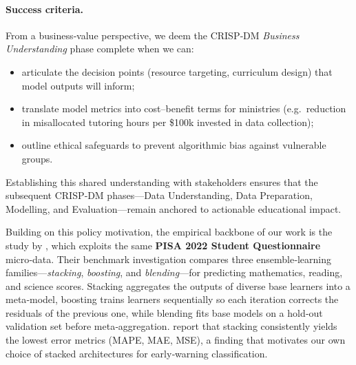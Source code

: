 \paragraph{Success criteria.}
From a business‑value perspective, we deem the CRISP‑DM \emph{Business Understanding} phase complete when we can:

\begin{itemize}
    \item articulate the decision points (resource targeting, curriculum design) that model outputs will inform;
    \item translate model metrics into cost–benefit terms for ministries (e.g.\ reduction in misallocated tutoring hours per \$100k invested in data collection);
    \item outline ethical safeguards to prevent algorithmic bias against vulnerable groups.
\end{itemize}

Establishing this shared understanding with stakeholders ensures that the subsequent CRISP‑DM phases—Data Understanding, Data Preparation, Modelling, and Evaluation—remain anchored to actionable educational impact.


Building on this policy motivation, the empirical backbone of our work is the study by \cite{Stacking}, which exploits the same \textbf{PISA 2022 Student Questionnaire} micro‑data.  Their benchmark investigation compares three ensemble‑learning families—\emph{stacking}, \emph{boosting}, and \emph{blending}—for predicting mathematics, reading, and science scores.  Stacking aggregates the outputs of diverse base learners into a meta‑model, boosting trains learners sequentially so each iteration corrects the residuals of the previous one, while blending fits base models on a hold‑out validation set before meta‑aggregation.  \citeauthor{Stacking} report that stacking consistently yields the lowest error metrics (MAPE, MAE, MSE), a finding that motivates our own choice of stacked architectures for early‑warning classification.

